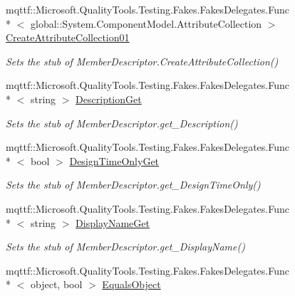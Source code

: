 \begin{DoxyCompactItemize}
mqttf\-::\-Microsoft.\-Quality\-Tools.\-Testing.\-Fakes.\-Fakes\-Delegates.\-Func\\*
$<$ global\-::\-System.\-Component\-Model.\-Attribute\-Collection $>$ \hyperlink{class_system_1_1_component_model_1_1_fakes_1_1_stub_property_descriptor_a7e87a3ed4fe5ba338ae45b0a05a458db}{Create\-Attribute\-Collection01}
\begin{DoxyCompactList}\small\item\em Sets the stub of Member\-Descriptor.\-Create\-Attribute\-Collection()\end{DoxyCompactList}\item 
mqttf\-::\-Microsoft.\-Quality\-Tools.\-Testing.\-Fakes.\-Fakes\-Delegates.\-Func\\*
$<$ string $>$ \hyperlink{class_system_1_1_component_model_1_1_fakes_1_1_stub_property_descriptor_acb12c5579adcf40e1bf90342a3b4624b}{Description\-Get}
\begin{DoxyCompactList}\small\item\em Sets the stub of Member\-Descriptor.\-get\-\_\-\-Description()\end{DoxyCompactList}\item 
mqttf\-::\-Microsoft.\-Quality\-Tools.\-Testing.\-Fakes.\-Fakes\-Delegates.\-Func\\*
$<$ bool $>$ \hyperlink{class_system_1_1_component_model_1_1_fakes_1_1_stub_property_descriptor_adec0ee1914bd3bf2be14bf107e9720b5}{Design\-Time\-Only\-Get}
\begin{DoxyCompactList}\small\item\em Sets the stub of Member\-Descriptor.\-get\-\_\-\-Design\-Time\-Only()\end{DoxyCompactList}\item 
mqttf\-::\-Microsoft.\-Quality\-Tools.\-Testing.\-Fakes.\-Fakes\-Delegates.\-Func\\*
$<$ string $>$ \hyperlink{class_system_1_1_component_model_1_1_fakes_1_1_stub_property_descriptor_a9914b8f48a9a9121454e61276beb1ffd}{Display\-Name\-Get}
\begin{DoxyCompactList}\small\item\em Sets the stub of Member\-Descriptor.\-get\-\_\-\-Display\-Name()\end{DoxyCompactList}\item 
mqttf\-::\-Microsoft.\-Quality\-Tools.\-Testing.\-Fakes.\-Fakes\-Delegates.\-Func\\*
$<$ object, bool $>$ \hyperlink{class_system_1_1_component_model_1_1_fakes_1_1_stub_property_descriptor_a6a5d0e93dede271e925cca1b00867e55}{Equals\-Object}

\end{DoxyCompactItemize}
